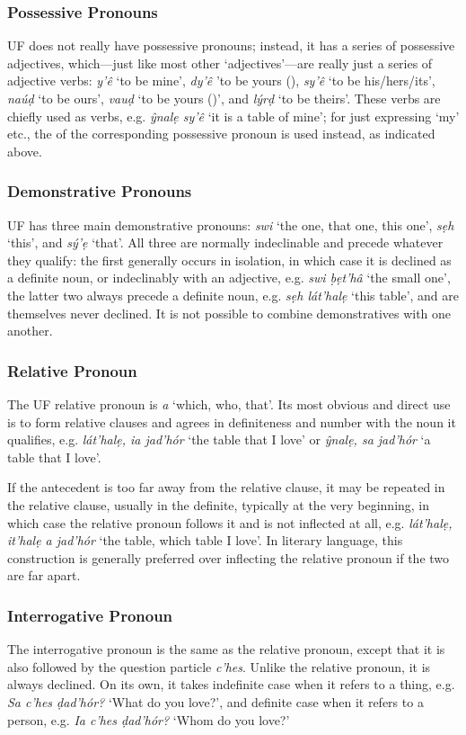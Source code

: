 \documentclass[a4paper, 12pt, twoside, final]{article}
\let \w \textit
\begin{document}
\subsubsection{Possessive Pronouns}
UF does not really have possessive pronouns; instead, it has a series of possessive adjectives, which—just like most other
‘adjectives’—are really just a series of adjective verbs: \w{y’ê} ‘to be mine’, \w{dy’ê} ’to be yours (),
\w{sy’ê} ‘to be his/hers/its’, \w{naúḍ} ‘to be ours’, \w{vauḍ} ‘to be yours ()’, and \w{lýrḍ} ‘to be theirs’. These verbs
are chiefly used as verbs, e.g. \w{ŷnalẹ sy’ê} ‘it is a table of mine’; for just expressing ‘my’ etc., the  of the
corresponding possessive pronoun is used instead, as indicated above.

\subsubsection{Demonstrative Pronouns}
UF has three main demonstrative pronouns: \w{swi} ‘the one, that one, this one’, \w{sẹh} ‘this’, and \w{sý’ẹ} ‘that’. All
three are normally indeclinable and precede whatever they qualify: the first generally occurs in isolation, in which
case it is declined as a definite noun, or indeclinably with an adjective, e.g. \w{swi ḅẹt’hâ} ‘the small one’, the
latter two always precede a definite noun, e.g. \w{sẹh lát’halẹ} ‘this table’, and are themselves never declined. It
is not possible to combine demonstratives with one another.

\subsubsection{Relative Pronoun}
The UF relative pronoun is \w{a} ‘which, who, that’. Its most obvious and direct use is to form relative
clauses and agrees in definiteness and number with the noun it qualifies, e.g. \w{lát’halẹ, ia jad’hór} ‘the
table that I love’ or \w{ŷnalẹ, sa jad’hór} ‘a table that I love’.

If the antecedent is too far away from the relative clause, it may be repeated in the relative clause,
usually in the definite, typically at the very beginning, in which case the relative pronoun follows it and is not inflected at
all, e.g. \w{lát’halẹ, it’halẹ a jad’hór} ‘the table, which table I love’. In literary language, this
construction is generally preferred over inflecting the relative pronoun if the two are far apart.

\subsubsection{Interrogative Pronoun}
The interrogative pronoun is the same as the relative pronoun, except that it is also followed by the
question particle \w{c’hes}. Unlike the relative pronoun, it is always declined. On its own, it takes
indefinite case when it refers to a thing, e.g. \w{Sa c’hes ḍad’hór?} ‘What do you love?’, and definite
case when it refers to a person, e.g. \w{Ia c’hes ḍad’hór?} ‘Whom do you love?’
\end{document}
